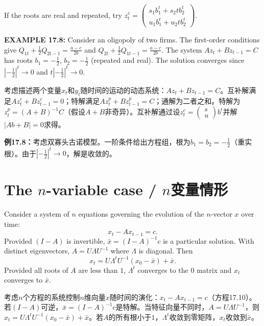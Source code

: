 \begin{original}
If the roots are real and repeated, try $z_t^c = \begin{pmatrix} s_1 b_1^t + s_2 t b_2^t \\ u_1 b_1^t + u_2 t b_2^t \end{pmatrix}$.

\textbf{EXAMPLE 17.8:} Consider an oligopoly of two firms. The first-order conditions give $Q_{1t} + \frac{1}{2} Q_{2t-1} = \frac{a-c}{2b}$ and $Q_{2t} + \frac{1}{2} Q_{1t-1} = \frac{a-c}{2b}$. The system $A z_t + B z_{t-1} = C$ has roots $b_1 = -\frac{1}{2}$, $b_2 = -\frac{1}{2}$ (repeated and real). The solution converges since $|-\frac{1}{2}|^t \to 0$ and $t|-\frac{1}{2}|^t \to 0$.
\end{original}
\begin{translation}
考虑描述两个变量$x_t$和$y_t$随时间的运动的动态系统：$A z_t + B z_{t-1} = C$。互补解满足$A z_t^c + B z_{t-1}^c = 0$；特解满足$A z_t^p + B z_{t-1}^p = C$；通解为二者之和。特解为$z_t^p = (A + B)^{-1}C$（假设$A+B$非奇异）。互补解通过设$z_t^c = \begin{pmatrix} s \\ u \end{pmatrix} b^t$并解$|Ab + B| = 0$求得。

\textbf{例17.8：}考虑双寡头古诺模型。一阶条件给出方程组，根为$b_1 = b_2 = -\frac{1}{2}$（重实根）。由于$|-\frac{1}{2}|^t \to 0$，解是收敛的。
\end{translation}

\section{The $n$-variable case / $n$变量情形}

\begin{original}
Consider a system of $n$ equations governing the evolution of the $n$-vector $x$ over time:
\[
x_t - A x_{t-1} = c. \tag{17.10}
\]
Provided $(I - A)$ is invertible, $\bar{x} = (I - A)^{-1} c$ is a particular solution. With distinct eigenvectors, $A = U \Lambda U^{-1}$ where $\Lambda$ is diagonal. Then
\[
x_t = U \Lambda^t U^{-1}(x_0 - \bar{x}) + \bar{x}.
\]
Provided all roots of $A$ are less than $1$, $\Lambda^t$ converges to the $0$ matrix and $x_t$ converges to $\bar{x}$.
\end{original}
\begin{translation}
考虑$n$个方程的系统控制$n$维向量$x$随时间的演化：$x_t - A x_{t-1} = c$（方程17.10）。若$(I - A)$可逆，$\bar{x} = (I - A)^{-1} c$是特解。当特征向量不同时，$A = U \Lambda U^{-1}$，则$x_t = U \Lambda^t U^{-1}(x_0 - \bar{x}) + \bar{x}$。若$A$的所有根小于$1$，$\Lambda^t$收敛到零矩阵，$x_t$收敛到$\bar{x}$。
\end{translation}

